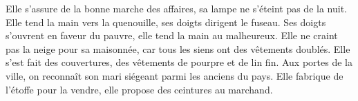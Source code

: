 Elle s’assure de la bonne marche des affaires, sa lampe ne s’éteint pas de la nuit.
	Elle tend la main vers la quenouille, ses doigts dirigent le fuseau.
Ses doigts s’ouvrent en faveur du pauvre, elle tend la main au malheureux.
Elle ne craint pas la neige pour sa maisonnée,
	car tous les siens ont des vêtements doublés.
Elle s’est fait des couvertures, des vêtements de pourpre et de lin fin.
Aux portes de la ville, on reconnaît son mari siégeant parmi les anciens du pays.
Elle fabrique de l’étoffe pour la vendre, elle propose des ceintures au marchand.
